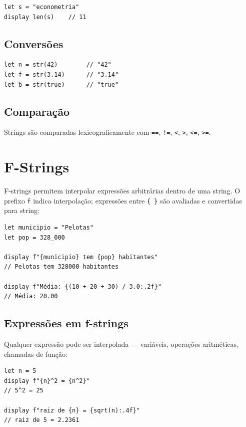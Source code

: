 \begin{lstlisting}
let s = "econometria"
display len(s)    // 11
\end{lstlisting}

\subsection*{Conversões}

\begin{lstlisting}
let n = str(42)        // "42"
let f = str(3.14)      // "3.14"
let b = str(true)      // "true"
\end{lstlisting}

\subsection*{Comparação}

Strings são comparadas lexicograficamente com \lstinline{==}, \lstinline{!=},
\lstinline{<}, \lstinline{>}, \lstinline{<=}, \lstinline{>=}.

\section{F-Strings}

F-strings permitem interpolar expressões arbitrárias dentro de uma string. O
prefixo \lstinline{f} indica interpolação; expressões entre \lstinline|{ }| são
avaliadas e convertidas para string:

\begin{lstlisting}[caption={F-strings}]
let municipio = "Pelotas"
let pop = 328_000

display f"{municipio} tem {pop} habitantes"
// Pelotas tem 328000 habitantes

display f"Média: {(10 + 20 + 30) / 3.0:.2f}"
// Média: 20.00
\end{lstlisting}

\subsection*{Expressões em f-strings}

Qualquer expressão pode ser interpolada — variáveis, operações aritméticas,
chamadas de função:

\begin{lstlisting}
let n = 5
display f"{n}^2 = {n^2}"
// 5^2 = 25

display f"raiz de {n} = {sqrt(n):.4f}"
// raiz de 5 = 2.2361
\end{lstlisting}

